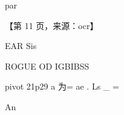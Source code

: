 \documentclass[UTF8,12pt,a4paper,openany]{ctexbook}
\begin{document}
\begin{enumerate}[label=\textbf{\arabic*.},leftmargin=2em]
par \par 【第 11 页，来源：ocr】\par EAR Sis\par ROGUE OD IGBIBSS\par pivot 21p29  a 为= ae . Ls \_ =\par An
\end{enumerate}
\end{document}

